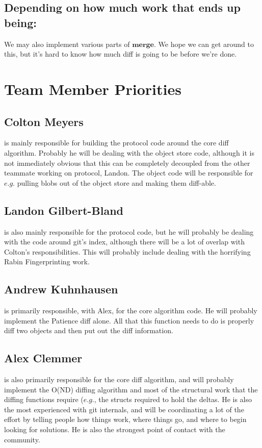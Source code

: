 \documentclass[a4paper]{article}
\begin{document}
\subsection{Depending on how much work that ends up being:}

We may also implement various parts of $\textbf{merge}$. We hope we can get around to this, but it's hard to know how much diff is going to be before we're done.

\section{Team Member Priorities}

\subsection{Colton Meyers} is mainly responsible for building the protocol code around the core diff algorithm. Probably he will be dealing with the object store code, although it is not immediately obvious that this can be completely decoupled from the other teammate working on protocol, Landon. The object code will be responsible for $\textit{e.g.}$ pulling blobs out of the object store and making them diff-able.

\subsection{Landon Gilbert-Bland} is also mainly responsible for the protocol code, but he will probably be dealing with the code around git's index, although there will be a lot of overlap with Colton's responsibilities. This will probably include dealing with the horrifying Rabin Fingerprinting work.

\subsection{Andrew Kuhnhausen} is primarily responsible, with Alex, for the core algorithm code. He will probably implement the Patience diff alone. All that this function needs to do is properly diff two objects and then put out the diff information.

\subsection{Alex Clemmer} is also primarily responsible for the core diff algorithm, and will probably implement the O(ND) diffing algorithm and most of the structural work that the diffing functions require ($\textit{e.g.}$, the structs required to hold the deltas. He is also the most experienced with git internals, and will be coordinating a lot of the effort by telling people how things work, where things go, and where to begin looking for solutions. He is also the strongest point of contact with the community.
\end{document}
